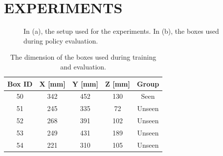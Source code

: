 \documentclass[letterpaper, 10 pt, conference]{ieeeconf}  %
\begin{document}
\section{EXPERIMENTS}

\begin{figure}[t]
    \centering
    \caption{In (a), the setup used for the experiments. In (b), the boxes used during policy evaluation.}
    \label{Setup_and_boxes}
\end{figure}


\begin{table}[t]
    \centering
    \caption{The dimension of the boxes used during training and evaluation.}
    \renewcommand{\arraystretch}{1.5}
    \begin{tabular}{c|ccc|c}
    \toprule Box ID & X [mm] & Y [mm] & Z [mm] & Group \\
    \midrule 50 & 342 & 452 & 130 & Seen \\
     51 & 245 & 335 & 72 & Unseen \\
     52 & 268 & 391 & 102 & Unseen \\
     53 & 249 & 431 & 189 & Unseen \\
     54 & 221 & 310 & 105 & Unseen \\
    \bottomrule 
    \end{tabular}
    \label{box-dim}
\end{table}
\end{document}
